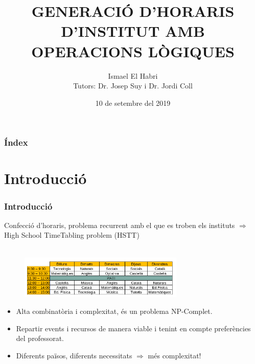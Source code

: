 \documentclass[13pt]{beamer}
\title[Generació d'horaris d'institut amb operacions lògiques]{GENERACIÓ D'HORARIS D'INSTITUT AMB OPERACIONS LÒGIQUES}
\author[Ismael El Habri]{Ismael El Habri \\ \footnotesize Tutors: Dr. Josep Suy i Dr. Jordi Coll}
\institute{Universitat de Girona}
\date[KPT 2004] %
{10 de setembre del 2019}
\begin{document}
\frame{\titlepage}
\begin{frame}
  \frametitle{Índex}
  \tableofcontents
\end{frame}

\section{Introducció}
  \begin{frame}
    \frametitle{Introducció}

    Confecció d'horaris, problema recurrent amb el que es troben els instituts $\Rightarrow$ High School TimeTabling problem (HSTT)\\ ~\\

    \begin{figure}
      \includegraphics[width=0.7\textwidth]{Diagrames/horari.png}
    \end{figure}
    
    \begin{itemize}
      \item Alta combinatòria i complexitat, és un problema NP-Complet.
      \item Repartir events i recursos de manera viable i tenint en compte preferències del professorat.
      \item Diferents països, diferents necessitats  $\Rightarrow$  més complexitat!
    \end{itemize}
    
    


  \end{frame}
\end{document}
